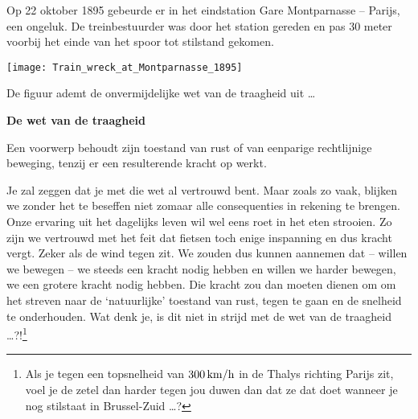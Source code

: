 \documentclass{ximera}
\begin{document}
	\author{Bart Lambregs}
    \xmsource\xmuitleg

	
	
	Op 22 oktober 1895 gebeurde er in het eindstation Gare Montparnasse -- Parijs, een ongeluk. De treinbestuurder was door het station gereden en pas 30 meter voorbij het einde van het spoor tot stilstand gekomen.
	\begin{image}
	\texttt{[image: Train\_wreck\_at\_Montparnasse\_1895]}
	\end{image}
	
	De figuur ademt de onvermijdelijke wet van de traagheid uit \ldots
	\begin{definition}
	{\textbf{De wet van de traagheid}}
	
	Een voorwerp behoudt zijn toestand van rust of van eenparige rechtlijnige beweging, tenzij er een resulterende kracht op werkt.
	\end{definition}
	
	
	
	Je zal zeggen dat je met die wet al vertrouwd bent. Maar zoals zo vaak, blijken we zonder het te beseffen niet zomaar alle consequenties in rekening te brengen. Onze ervaring uit het dagelijks leven
	wil wel eens roet in het eten strooien. Zo zijn we vertrouwd met het feit dat
	fietsen toch enige inspanning en dus kracht vergt. Zeker als de wind tegen zit.
	We zouden dus kunnen aannemen dat -- willen we bewegen -- we steeds een kracht nodig
	hebben en willen we harder bewegen, we een grotere kracht nodig hebben. Die kracht zou dan moeten dienen om om het streven naar de `natuurlijke' toestand van rust, tegen te gaan en de snelheid te onderhouden. Wat denk je, is dit niet in strijd met de wet van de traagheid \ldots?!\footnote{Als je tegen een topsnelheid van $300\rm\,km/h$ in de Thalys richting Parijs zit, voel je de zetel dan harder tegen jou duwen dan dat ze dat doet wanneer je nog stilstaat in Brussel-Zuid \ldots?}
	
\end{document}
